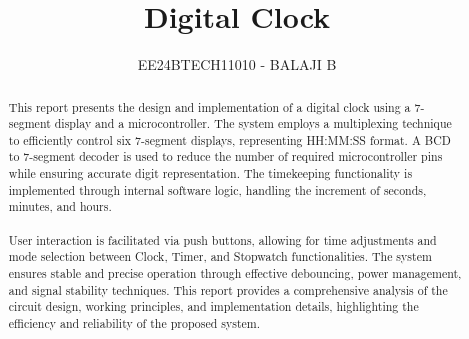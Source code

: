 \documentclass[journal]{IEEEtran}
\begin{document}

\vspace{3cm}

\title{Digital Clock}
\author{EE24BTECH11010 - BALAJI B}
{\let\newpage\relax\maketitle}

\renewcommand{\thefigure}{\theenumi}
\renewcommand{\thetable}{\theenumi}
\setlength{\intextsep}{10pt} %
\renewcommand{\thetable}{\theenumi}

\begin{abstract}
    This report presents the design and implementation of a digital clock using a 7-segment display and a microcontroller. The system employs a multiplexing technique to efficiently control six 7-segment displays, representing HH:MM:SS format. A BCD to 7-segment decoder is used to reduce the number of required microcontroller pins while ensuring accurate digit representation. The timekeeping functionality is implemented through internal software logic, handling the increment of seconds, minutes, and hours. \\ \\
    User interaction is facilitated via push buttons, allowing for time adjustments and mode selection between Clock, Timer, and Stopwatch functionalities. The system ensures stable and precise operation through effective debouncing, power management, and signal stability techniques. This report provides a comprehensive analysis of the circuit design, working principles, and implementation details, highlighting the efficiency and reliability of the proposed system.
\end{abstract}

\end{document}
